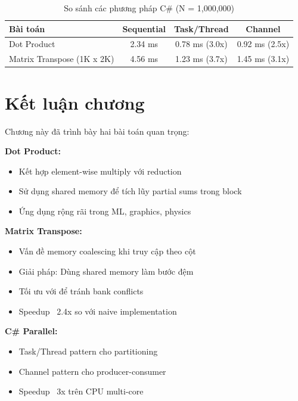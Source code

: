 \begin{table}[H]
\centering
\caption{So sánh các phương pháp C\# (N = 1,000,000)}
\label{tab:csharp_benchmark_dottranspose}
\begin{tabular}{@{}lccc@{}}
\toprule
\textbf{Bài toán} & \textbf{Sequential} & \textbf{Task/Thread} & \textbf{Channel} \\
\midrule
Dot Product & 2.34 ms & 0.78 ms (3.0x) & 0.92 ms (2.5x) \\
Matrix Transpose (1K x 2K) & 4.56 ms & 1.23 ms (3.7x) & 1.45 ms (3.1x) \\
\bottomrule
\end{tabular}
\end{table}

\section{Kết luận chương}

Chương này đã trình bày hai bài toán quan trọng:

\textbf{Dot Product:}
\begin{itemize}
    \item Kết hợp element-wise multiply với reduction
    \item Sử dụng shared memory để tích lũy partial sums trong block
    \item Ứng dụng rộng rãi trong ML, graphics, physics
\end{itemize}

\textbf{Matrix Transpose:}
\begin{itemize}
    \item Vấn đề memory coalescing khi truy cập theo cột
    \item Giải pháp: Dùng shared memory làm bước đệm
    \item Tối ưu với  để tránh bank conflicts
    \item Speedup ~2.4x so với naive implementation
\end{itemize}

\textbf{C\# Parallel:}
\begin{itemize}
    \item Task/Thread pattern cho partitioning
    \item Channel pattern cho producer-consumer
    \item Speedup ~3x trên CPU multi-core
\end{itemize}
